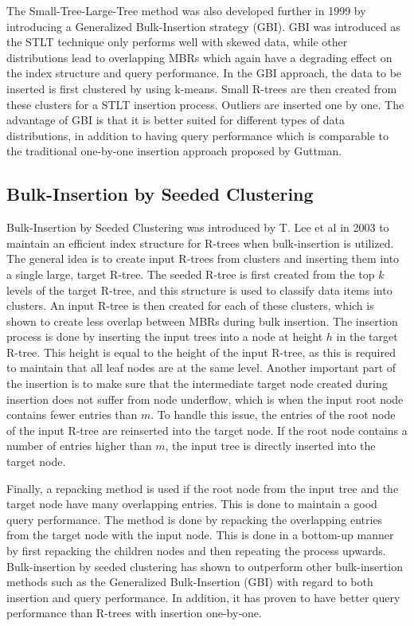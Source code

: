 \noindent
The Small-Tree-Large-Tree method was also developed further in 1999 by introducing a Generalized Bulk-Insertion strategy (GBI)\cite{GBI}. GBI was introduced as the STLT technique only performs well with skewed data, while other distributions lead to overlapping MBRs which again have a degrading effect on the index structure and query performance. In the GBI approach, the data to be inserted is first clustered by using k-means. Small R-trees are then created from these clusters for a STLT insertion process. Outliers are inserted one by one. The advantage of GBI is that it is better suited for different types of data distributions, in addition to having query performance which is comparable to the traditional one-by-one insertion approach proposed by Guttman\cite{GBI}.

\subsection{Bulk-Insertion by Seeded Clustering}
Bulk-Insertion by Seeded Clustering was introduced by T. Lee et al in 2003 to maintain an efficient index structure for R-trees when bulk-insertion is utilized\cite{SeededClustering}. The general idea is to create input R-trees from clusters and inserting them into a single large, target R-tree. The seeded R-tree is first created from the top $k$ levels of the target R-tree, and this structure is used to classify data items into clusters. An input R-tree is then created for each of these clusters, which is shown to create less overlap between MBRs during bulk insertion. The insertion process is done by inserting the input trees into a node at height $h$ in the target R-tree. This height is equal to the height of the input R-tree, as this is required to maintain that all leaf nodes are at the same level. Another important part of the insertion is to make sure that the intermediate target node created during insertion does not suffer from node underflow, which is when the input root node contains fewer entries than $m$. To handle this issue, the entries of the root node of the input R-tree are reinserted into the target node. If the root node contains a number of entries higher than $m$, the input tree is directly inserted into the target node.\newline

\noindent
Finally, a repacking method is used if the root node from the input tree and the target node have many overlapping entries. This is done to maintain a good query performance. The method is done by repacking the overlapping entries from the target node with the input node. This is done in a bottom-up manner by first repacking the children nodes and then repeating the process upwards. Bulk-insertion by seeded clustering has shown to outperform other bulk-insertion methods such as the Generalized Bulk-Insertion (GBI) with regard to both insertion and query performance. In addition, it has proven to have better query performance than R-trees with insertion one-by-one\cite{SeededClustering}.

